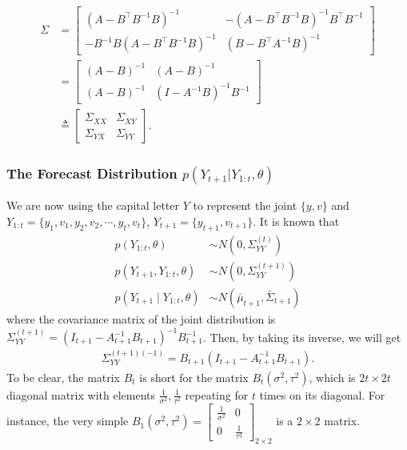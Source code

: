 \begin{align*}
\Sigma &= \begin{bmatrix}
(A-B^\top B^{-1}B) ^{-1} & -(A-B^\top B^{-1}B)^{-1}B^\top B^{-1}\\
- B^{-1}B(A-B^\top B^{-1}B)^{-1} & (B-B^\top A^{-1}B) ^{-1}
\end{bmatrix} \\
&= \begin{bmatrix}
(A-B) ^{-1} & (A-B)^{-1}\\
(A-B)^{-1} & (I- A^{-1}B) ^{-1}B^{-1}
\end{bmatrix} \\
&\triangleq \begin{bmatrix}
\Sigma_{XX} & \Sigma_{XY} \\
\Sigma_{YX}  &\Sigma_{YY} 
\end{bmatrix}.
\end{align*}



\subsubsection{The Forecast Distribution $p(Y_{t+1}| Y_{1:t},\theta)$}

We are now using the capital letter $Y$ to represent the joint $\{y,v\}$ and $Y_{1:t} = \{y_1,v_1,y_2,v_2,\cdots, y_t, v_t \}$, $Y_{t+1} = \{y_{t+1}, v_{t+1}\}$. It is known that 
\begin{align*}
p(Y_{1:t},\theta) &\sim N\left( 0,\Sigma_{YY}^{(t)} \right)\\
p(Y_{t+1},Y_{1:t},\theta) &\sim N\left( 0,\Sigma_{YY}^{(t+1)} \right)\\
p(Y_{t+1}\mid Y_{1:t},\theta) &\sim N\left( \bar{\mu}_{t+1},\bar{\Sigma}_{t+1} \right)
\end{align*}
where the covariance matrix of the joint distribution is $\Sigma_{YY}^{(t+1)} = (I_{t+1}-A_{t+1}^{-1}B_{t+1})^{-1}B_{t+1}^{-1}$. Then, by taking its inverse, we will get
\begin{align*}
\Sigma_{YY}^{(t+1) (-1)} = B_{t+1}(I_{t+1}-A_{t+1}^{-1}B_{t+1}).
\end{align*}
To be clear, the matrix $B_t$ is short for the matrix $B_t(\sigma^2,\tau^2)$, which is $2t\times 2t$ diagonal matrix with elements $\frac{1}{\sigma^2},\frac{1}{\tau^2}$ repeating for $t$ times on its diagonal. For instance, the very simple $B_1(\sigma^2,\tau^2) = 
\begin{bmatrix}
\frac{1}{\sigma^2} & 0  \\
0 & \frac{1}{\tau^2}
\end{bmatrix}_{2\times 2}$ is a $2\times 2$ matrix. 

